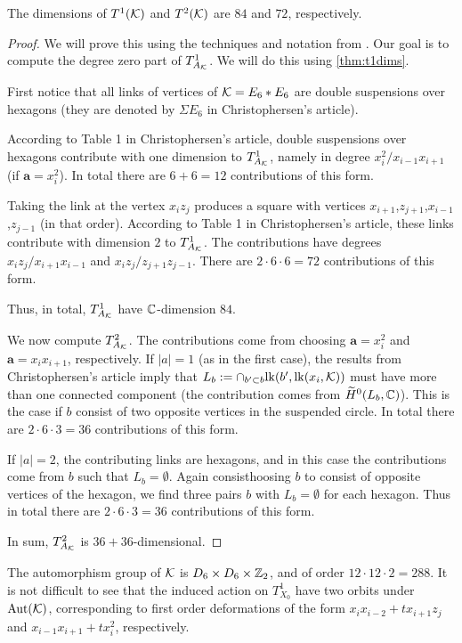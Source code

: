 \begin{lemma}
The dimensions of $T^1(\mathcal{K})$ and $T^2(\mathcal{K})$ are $84$ and $72$, respectively.
\end{lemma}
\begin{proof}
We will prove this using the techniques and notation from \cite{deforming_christophersen}. Our goal is to compute the degree zero part of $T^1_{A_{\mathcal{K}}}$. We will do this using \cref{thm:t1dims}.

First notice that all links of vertices of $\mathcal{K}=E_6 \ast E_6$ are double suspensions over hexagons (they are denoted by $\Sigma E_6$ in Christophersen's article). 

According to Table 1 in Christophersen's article, double suspensions over hexagons contribute with one dimension to $T^1_{A_{\mathcal{K}}}$, namely in degree $x_i^2/x_{i-1}x_{i+1}$ (if $\mathbf a =x_i^2$). In total there are $6+6=12$ contributions of this form.

Taking the link at the vertex $x_iz_j$ produces a square with vertices $x_{i+1}$,$z_{j+1}$,$x_{i-1}$,$z_{j-1}$ (in that order). According to Table 1 in Christophersen's article, these links contribute with dimension $2$ to $T^1_{A_{\mathcal{K}}}$. The contributions have degrees $x_iz_j/x_{i+1}x_{i-1}$ and $x_iz_j/z_{j+1}z_{j-1}$. There are $2 \cdot 6 \cdot 6=72$ contributions of this form.

Thus, in total, $T^1_{A_{\mathcal{K}}}$ have $\mathbb{C}$-dimension $84$.

We now compute $T^2_{A_{\mathcal{K}}}$. The contributions come from choosing $\mathbf a=x_i^2$ and $\mathbf a=x_ix_{i+1}$, respectively. If $|a|=1$ (as in the first case), the results from Christophersen's article imply that $L_b := \cap_{b' \subset b} \mathrm{lk}(b',\mathrm{lk}(x_i,\mathcal{K}))$ must have more than one connected component (the contribution comes from $\widetilde H^0(L_b,\mathbb{C})$). This is the case if $b$ consist of two opposite vertices in the suspended circle. In total there are $2 \cdot 6 \cdot 3=36$ contributions of this form. 

If $|a|=2$, the contributing links are hexagons, and in this case the contributions come from $b$ such that $L_b=\emptyset$. Again consisthoosing $b$ to consist of opposite vertices of the hexagon, we find three pairs $b$ with $L_b=\emptyset$ for each hexagon. Thus in total there are $2 \cdot 6 \cdot 3=36$ contributions of this form.

In sum, $T^2_{A_{\mathcal{K}}}$ is $36+36$-dimensional.
\end{proof}

The automorphism group of $\mathcal{K}$ is $D_6 \times D_6 \times \mathbb{Z}_2$, and of order $12 \cdot 12 \cdot 2=288$. It is not difficult to see that the induced action on $T_{X_0}^1$ have two orbits under $\operatorname{Aut}(\mathcal{K})$, corresponding to first order deformations of the form $x_ix_{i-2}+t x_{i+1}z_j$ and $x_{i-1}x_{i+1}+tx_i^2$, respectively. 

